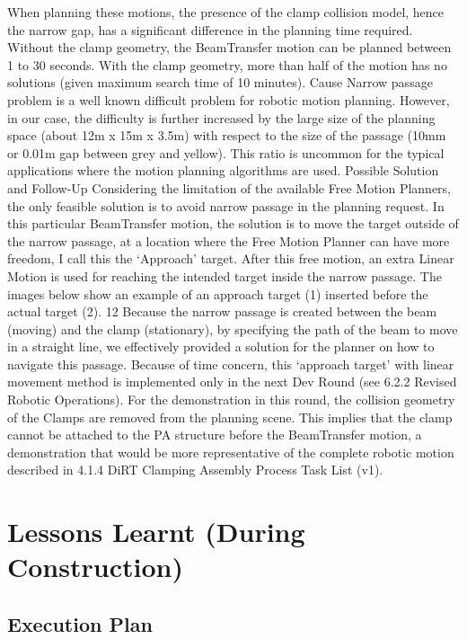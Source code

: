 When planning these motions, the presence of the clamp collision model, hence the narrow gap, has a significant difference in the planning time required. Without the clamp geometry, the BeamTransfer motion can be planned between 1 to 30 seconds. With the clamp geometry, more than half of the motion has no solutions (given maximum search time of 10 minutes).
Cause
Narrow passage problem is a well known difficult problem for robotic motion planning. However, in our case, the difficulty is further increased by the large size of the planning space (about 12m x 15m x 3.5m) with respect to the size of the passage (10mm or 0.01m gap between grey and yellow). This ratio is uncommon for the typical applications where the motion planning algorithms are used.
Possible Solution and Follow-Up
Considering the limitation of the available Free Motion Planners, the only feasible solution is to avoid narrow passage in the planning request. In this particular BeamTransfer motion, the solution is to move the target outside of the narrow passage, at a location where the Free Motion Planner can have more freedom, I call this the ‘Approach’ target. After this free motion, an extra Linear Motion is used for reaching the intended target inside the narrow passage. The images below show an example of an approach target (1) inserted before the actual target (2).
12
Because the narrow passage is created between the beam (moving) and the clamp (stationary), by specifying the path of the beam to move in a straight line, we effectively provided a solution for the planner on how to navigate this passage. 
Because of time concern, this ‘approach target’ with linear movement method is implemented only in the next Dev Round (see 6.2.2 Revised Robotic Operations). For the demonstration in this round, the collision geometry of the Clamps are removed from the planning scene. This implies that the clamp cannot be attached to the PA structure before the BeamTransfer motion, a demonstration that would be more representative of the complete robotic motion described in 4.1.4 DiRT Clamping Assembly Process Task List (v1).

\section{Lessons Learnt (During Construction)}
\subsection{Execution Plan}

